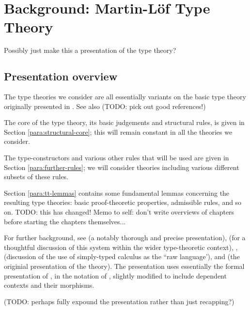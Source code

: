 
\chapter{Background: Martin-L\"o{}f Type Theory}

Possibly just make this a presentation of the type theory?

\section{Presentation overview}

\para The type theories we consider are all essentially variants on the basic type theory originally presented in \cite{martin-loef:predicative-part}.  See also (TODO: pick out good references!)

The core of the type theory, its basic judgements and structural rules, is given in Section \ref{para:structural-core}; this will remain constant in all the theories we consider.

The type-constructors and various other rules that will be used are given in Section \ref{para:further-rules}; we will consider theories including various different subsets of these rules.

Section \ref{para:tt-lemmas} contains some fundamental lemmas concerning the resulting type theories: basic proof-theoretic properties, admissible rules, and so on.  TODO: this has changed!  Memo to self: don't write overviews of chapters before starting the chapters themselves...

For further background, see \cite{pitts:categorical-logic} (a notably thorough and precise presentation), \cite[\S6]{jacobs:categorical-logic} (for a thoughtful discussion of this system within the wider type-theoretic context), \cite{hofmann:syntax-and-semantics}, \cite[Ch.3]{n-p-s:programming} (discussion of the use of simply-typed calculus as the ``raw language'), and \cite{martin-loef:predicative-part} (the originial presentation of the theory).  The presentation uses essentially the formal presentation of \cite{pitts:categorical-logic}, in the notation of \cite{jacobs:categorical-logic}, slightly modified to include dependent contexts and their morphisms. 

(TODO: perhaps fully expound the presentation rather than just recapping?)

